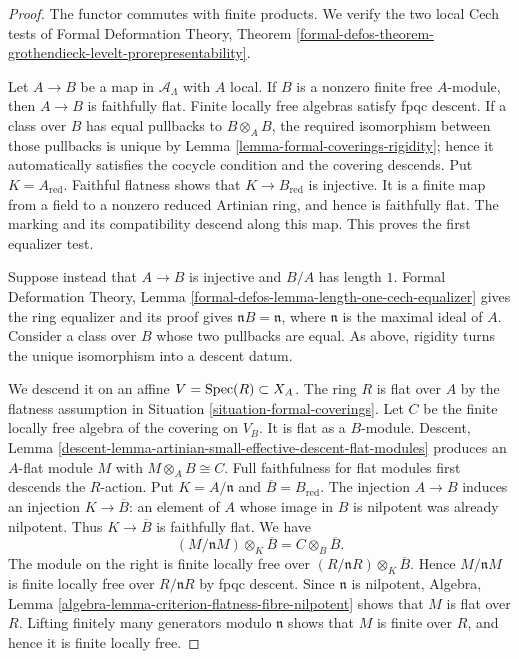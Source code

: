 \begin{proof}
The functor commutes with finite products. We verify the two local Cech tests
of Formal Deformation Theory, Theorem
\ref{formal-defos-theorem-grothendieck-levelt-prorepresentability}.

Let $A \to B$ be a map in $\mathcal{A}_\Lambda$ with $A$ local. If $B$ is a
nonzero finite free $A$-module, then $A \to B$ is faithfully flat. Finite
locally free algebras satisfy fpqc descent. If a class over $B$ has equal
pullbacks to $B \otimes_A B$, the required isomorphism between those pullbacks
is unique by Lemma \ref{lemma-formal-coverings-rigidity}; hence it
automatically satisfies the cocycle condition and the covering descends. Put
$K=A_{\mathrm{red}}$. Faithful flatness shows that
$K \to B_{\mathrm{red}}$ is injective. It is a finite map from a field to a
nonzero reduced Artinian ring, and hence is faithfully flat. The marking and
its compatibility descend along this map. This proves the first equalizer
test.

Suppose instead that $A \to B$ is injective and $B/A$ has length $1$.
Formal Deformation Theory, Lemma
\ref{formal-defos-lemma-length-one-cech-equalizer} gives the ring equalizer
and its proof gives $\mathfrak nB = \mathfrak n$, where $\mathfrak n$ is the
maximal ideal of $A$. Consider a class over $B$ whose two pullbacks are equal.
As above, rigidity turns the unique isomorphism into a descent datum.

We descend it on an affine $V = \mathop{\mathrm{Spec}}(R) \subset X_A$. The ring $R$ is flat
over $A$ by the flatness assumption in Situation
\ref{situation-formal-coverings}. Let $C$ be the finite locally free algebra
of the covering on $V_B$. It is flat as a $B$-module. Descent, Lemma
\ref{descent-lemma-artinian-small-effective-descent-flat-modules} produces an
$A$-flat module $M$ with $M \otimes_A B \cong C$. Full faithfulness for flat
modules first descends the $R$-action. Put $K=A/\mathfrak n$ and
$\overline B=B_{\mathrm{red}}$. The injection $A \to B$ induces an
injection $K \to \overline B$: an element of $A$ whose image in $B$ is
nilpotent was already nilpotent. Thus $K \to \overline B$ is faithfully
flat. We have
$$
(M/\mathfrak nM) \otimes_K \overline B
= C \otimes_B \overline B.
$$
The module on the right is finite locally free over
$(R/\mathfrak nR) \otimes_K \overline B$. Hence
$M/\mathfrak nM$ is finite locally free over $R/\mathfrak nR$ by fpqc
descent. Since $\mathfrak n$ is nilpotent, Algebra, Lemma
\ref{algebra-lemma-criterion-flatness-fibre-nilpotent} shows that $M$ is flat
over $R$. Lifting finitely many generators modulo $\mathfrak n$ shows that
$M$ is finite over $R$, and hence it is finite locally free.


\end{proof}
